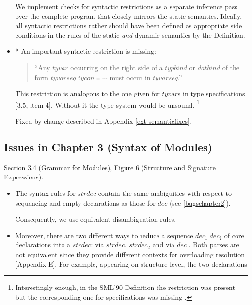 \documentclass[twoside,titlepage]{article}
\begin{document}
\begin{appendix}
\begin{itemize}
We implement checks for syntactic restrictions as a separate inference pass over the complete program that closely mirrors the static semantics. Ideally, all syntactic restrictions rather should have been defined as appropriate side conditions in the rules of the static \emph{and} dynamic semantics by the Definition.

\item * An important syntactic restriction is missing:

\begin{quote}
``Any $\mathit{tyvar}$ occurring on the right side of a $\mathit{typbind}$ or $\mathit{datbind}$ of the form $\mathit{tyvarseq}$ $\mathit{tycon}$ {\tt =} $\cdots$ must occur in $\mathit{tyvarseq}$.''
\end{quote}

This restriction is analogous to the one given for $\mathit{tyvar}$s in type specifications [3.5, item 4]. Without it the type system would be unsound. \footnote{Interestingly enough, in the SML'90 Definition the restriction was present, but the corresponding one for specifications was missing \cite{commentary, mistakes}.}

Fixed by change described in Appendix \ref{ext-semanticfixes}.

\end{itemize}


\subsection{Issues in Chapter 3 (Syntax of Modules)}
\label{bugschapter3}

Section 3.4 (Grammar for Modules), Figure 6 (Structure and Signature Expressions):

\begin{itemize}

\item The syntax rules for $\mathit{strdec}$ contain the same ambiguities with respect to sequencing and empty declarations as those for $\mathit{dec}$ (see \ref{bugschapter2}).

Consequently, we use equivalent disambiguation rules.

\item Moreover, there are two different ways to reduce a sequence $\mathit{dec}_1\;\mathit{dec}_2$ of core declarations into a $\mathit{strdec}$: via $\mathit{strdec}_1\;\mathit{strdec}_2$ and via $\mathit{dec}$ \cite{mistakes}. Both parses are not equivalent since they provide different contexts for overloading resolution [Appendix E]. For example, appearing on structure level, the two declarations


\end{itemize}
\end{appendix}
\end{document}
